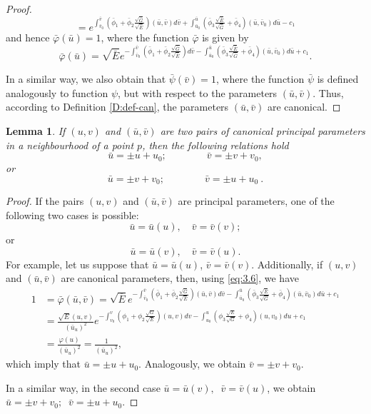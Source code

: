 \documentclass[12pt]{amsart}
\newtheorem{lem}[thm]{Lemma}
\theoremstyle{definition}
\theoremstyle{remark}
\newcommand{\ds}{\displaystyle}
\numberwithin{equation}{section}
\begin{document}
\begin{proof}
	$$
	=e^{\ds\int_{\bar v_0}^{\bar v}\left(\bar \phi_1+\bar \phi_2\frac{\sqrt {\bar G}}{\sqrt {\bar E}}\right)(\bar u,\bar v)d\bar v
		+\int_{\bar u_0}^{\bar u}\left(\bar \phi_3\frac{\sqrt {\bar E}}{\sqrt {\bar G}}+ \bar \phi_4\right)(\bar u,\bar v_0)d\bar u-c_1}
	$$
	and hence $\bar\varphi (\bar u)=1$, where the function $\bar\varphi$ is given by
$$
\ds\bar\varphi (\bar u) = \sqrt{ \bar E} e^{\ds-\int_{\bar{v}_0}^{\bar v}\left(\bar\phi_1+\bar\phi_2\frac{\sqrt{\bar G}}{\sqrt{\bar E}}\right)d\bar v
	-\int_{\bar{u}_0}^{\bar u}\left(\bar\phi_3\frac{\sqrt{\bar E}}{\sqrt{\bar G}}+\bar\phi_4\right)(\bar u,\bar{v}_0)d\bar u+c_1}.
$$

In a  similar way, we also obtain that $\bar\psi(\bar v)=1$, where the function $\bar\psi$ is defined analogously to function $\psi$, but with respect to the parameters $(\bar u,\bar v)$. Thus, according to Definition \ref{D:def-can}, the parameters $(\bar u,\bar v)$ are canonical.
	
\end{proof}



\begin{lem} If $(u,v)$ and $(\bar u,\bar v)$ are two pairs of canonical principal parameters
	in a neighbourhood of a point $p$, then the following relations hold
	$$
	\bar u=\pm u +u_0; \qquad\qquad	\bar v=\pm v+v_0,
	$$
	or
	$$
	\bar u=\pm v+v_0; \qquad\qquad	\bar v=\pm u+u_0 \ .
	$$
\end{lem}

\begin{proof}
	If the pairs $(u,v)$ and $(\bar u,\bar v)$ are principal parameters, one of the following two cases is possible:
	$$\bar u=\bar u(u), \quad \bar v= \bar v(v);$$
	or  
	$$\bar u=\bar u(v), \quad \bar v= \bar v(u).$$
	For example, let us suppose that $\bar u=\bar u(u)$, $\bar v= \bar v(v) $. Additionally, if $(u,v)$ and $(\bar u,\bar v)$ are canonical parameters, then, using \eqref{eq:3.6}, we have
	\begin{equation*}
		\begin{split}
		1 & =\bar\varphi(\bar u,{\bar v})=\sqrt{\overline E}e^{-\ds\int_{\bar v_0}^{\bar v}\left(\bar \phi_1+\bar \phi_2\frac{\sqrt {\bar G}}{\sqrt {\bar E}}\right)(\bar u,\bar v)d\bar v
			-\int_{\bar u_0}^{\bar u}\left(\bar \phi_3\frac{\sqrt {\bar E}}{\sqrt {\bar G}}+ \bar \phi_4\right)(\bar u,\bar v_0)d\bar u+c_1} \\
		& 	=\frac{\sqrt{E}(u,v)}{(\bar u_u)^2}e^{-\ds\int_{v_0}^v\left(\phi_1+\phi_2\frac{\sqrt G}{\sqrt E}\right)(u,v)dv
			-\int_{u_0}^u\left(\phi_3\frac{\sqrt {E}}{\sqrt {G}}+\phi_4\right)(u,v_0)du+c_1} \\
		& =\frac{\varphi(u)}{(\bar u_u)^2}=\frac{1}{(\bar u_u)^2},
		\end{split}
	\end{equation*}
which imply that $\bar u=\pm u+u_0$. Analogously, we obtain $\bar v=\pm v+v_0$.
	
In a similar way, in the second case $\bar u=\bar u(v), \;\; \bar v= \bar v(u)$, we obtain $\bar u=\pm v+v_0; \;\; \bar v=\pm u+u_0$. 
	
\end{proof}
\end{document}
